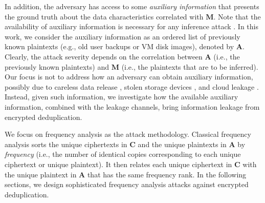 
In addition, the adversary has access to some {\em auxiliary information} that
presents the ground truth about the data characteristics correlated with
$\mathbf{M}$. Note that the availability of auxiliary information is necessary
for any inference attack \cite{kumar07,li17,grubbs17,zhang16b,kellaris16,ritzdorf16,naveed15,cash15,islam12}.
In this work, we consider the auxiliary information as an ordered list of
previously known plaintexts (e.g., old user backups or VM disk images),
denoted by $\mathbf{A}$.  Clearly, the attack severity depends on the
correlation between $\mathbf{A}$ (i.e., the previously known plaintexts) and
$\mathbf{M}$ (i.e., the plaintexts that are to be inferred).  Our focus is not
to address how an adversary can obtain auxiliary information, possibly due to
careless data release \cite{careless-release}, stolen storage devices
\cite{stolen-device}, and cloud leakage \cite{cloud-leakage}. Instead, given
such information, we investigate how the available auxiliary information,
combined with the leakage channels, bring information leakage from encrypted
deduplication. 

We focus on frequency analysis \cite{alkadit92} as the attack methodology.
Classical frequency analysis sorts the unique ciphertexts in $\mathbf{C}$ and
the unique plaintexts in $\mathbf{A}$ by {\em frequency} (i.e., the number of
identical copies corresponding to each unique ciphertext or unique plaintext). 
It then relates each unique ciphertext in $\mathbf{C}$ with the unique
plaintext in $\mathbf{A}$ that has the same frequency rank. In the following
sections, we design sophisticated frequency analysis attacks against encrypted
deduplication. 


